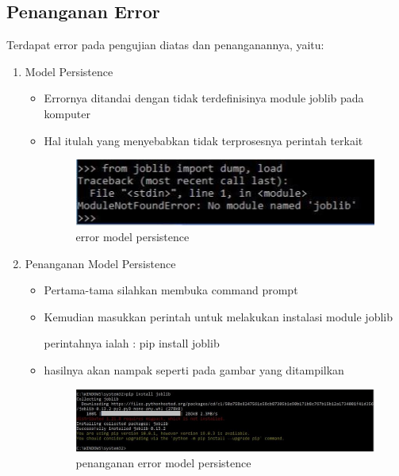 \begin{itemize}
\subsection{Penanganan Error}
Terdapat error pada pengujian diatas dan penanganannya, yaitu:
\begin{enumerate}
\item Model Persistence
\begin{itemize}
\item Errornya ditandai dengan tidak terdefinisinya module joblib pada komputer
\item Hal itulah yang menyebabkan tidak terprosesnya perintah terkait
\par

\begin{figure}[ht]
\centering
\includegraphics[scale=0.6]{figures/er.jpg}
\caption{error model persistence}
\label{contoh}
\end{figure}

\par
\par
\par
\end{itemize}
\item Penanganan Model Persistence
\begin{itemize}
\item Pertama-tama silahkan membuka command prompt
\item Kemudian masukkan perintah untuk melakukan instalasi module joblib
\par perintahnya ialah : pip install joblib
\item hasilnya akan nampak seperti pada gambar yang ditampilkan
\par

\begin{figure}[ht]
\centering
\includegraphics[scale=0.4]{figures/penanganan1.jpg}
\caption{penanganan error model persistence }
\label{contoh}
\end{figure}


\end{itemize}
\end{enumerate}
\end{itemize}
